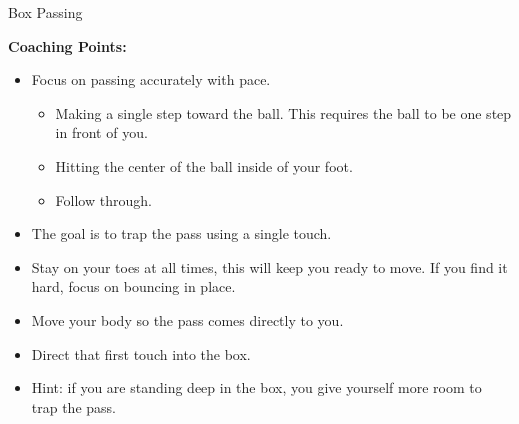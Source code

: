 \begin{oddBlock}{Box Passing}
\begin{minipage}[t]{\linewidth}
\begin{minipage}{.6\linewidth}
        \textbf{Coaching Points:}
        \begin{itemize}
            \setlength{\itemsep}{0pt}
            \setlength{\parskip}{0pt}
            \setlength{\parsep}{0pt}
            \item Focus on passing accurately with pace.
            \begin{itemize}
                \item Making a single step toward the ball.  This requires the ball to be one step in front of you.
                \item Hitting the center of the ball inside of your foot.
                \item Follow through.
            \end{itemize} 
            \item The goal is to trap the pass using a single touch.
            \item Stay on your toes at all times, this will keep you ready to move.  If you find it hard, focus on bouncing in place.
            \item Move your body so the pass comes directly to you.
            \item Direct that first touch into the box.
            \item Hint: if you are standing deep in the box, you give yourself more room to trap the pass.
        \end{itemize}

    \end{minipage}
\end{minipage}

\end{oddBlock}
